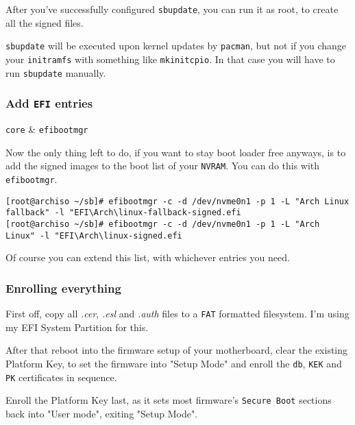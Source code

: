 \documentclass[10pt]{dustdoc}
\begin{document}
After you’ve successfully configured \texttt{sbupdate}, you can run it as root, to create all the signed files.

\begin{NOTE}
    \texttt{sbupdate} will be executed upon kernel updates by \texttt{pacman}, but not if you change your \texttt{initramfs} with something like \texttt{mkinitcpio}.
    In that case you will have to run \texttt{sbupdate} manually.
\end{NOTE}

\subsubsection{Add \texttt{EFI} entries}
\label{sec:add-efi-entries}

\begin{packagetable}
    \texttt{core} & \texttt{efibootmgr} \\ 
\end{packagetable}

Now the only thing left to do, if you want to stay boot loader free anyways, is to add the signed images to the boot list of your \texttt{NVRAM}.
You can do this with \texttt{efibootmgr}.

\begin{verbatim}
[root@archiso ~/sb]# efibootmgr -c -d /dev/nvme0n1 -p 1 -L "Arch Linux fallback" -l "EFI\Arch\linux-fallback-signed.efi
[root@archiso ~/sb]# efibootmgr -c -d /dev/nvme0n1 -p 1 -L "Arch Linux" -l "EFI\Arch\linux-signed.efi
\end{verbatim}

Of course you can extend this list, with whichever entries you need.

\subsubsection{Enrolling everything}
\label{sec:enrolling-everything}

First off, copy all \textit{.cer}, \textit{.esl} and \textit{.auth} files to a \texttt{FAT} formatted filesystem.
I’m using my EFI System Partition for this.

After that reboot into the firmware setup of your motherboard, clear the existing Platform Key, to set the firmware into "Setup Mode" and enroll the \texttt{db}, \texttt{KEK} and \texttt{PK} certificates in sequence.

\begin{NOTE}
    Enroll the Platform Key last, as it sets most firmware’s \texttt{Secure Boot} sections back into "User mode", exiting "Setup Mode".
\end{NOTE}
\end{document}
